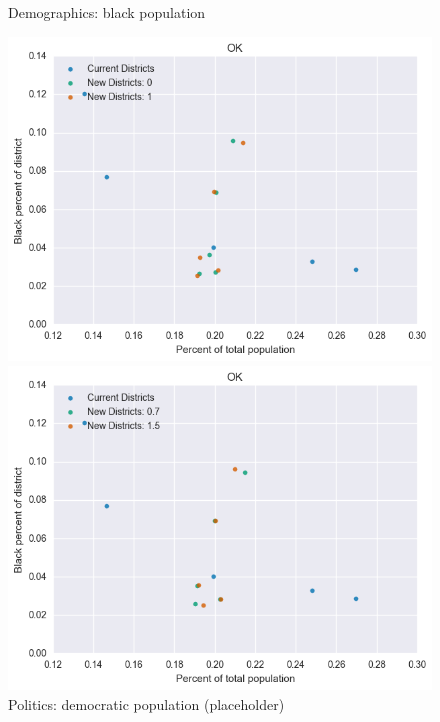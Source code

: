 \begin{figure}[htb!] \centering
\caption{ Demographics: black population }
\includegraphics[width=4.5in]{../analysis/OK/analysis_scatter.png}
\caption{ Politics: democratic population (placeholder)}
\includegraphics[width=4.5in]{../analysis/OK/analysis_scatter2.png}
\end{figure}

\clearpage
\newpage

